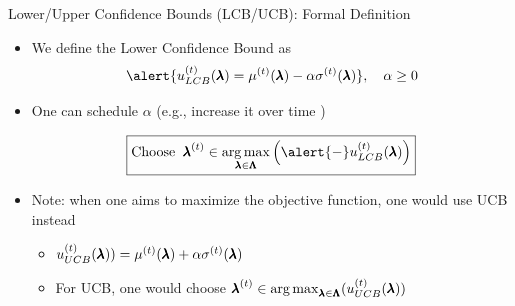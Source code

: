 \begin{frame}[c]{Lower/Upper Confidence Bounds (LCB/UCB): Formal Definition}
\begin{itemize}
    \item We define the \alert{Lower Confidence Bound} as
    \[\alert{\iter{\acq}_{LCB}(\conf) = \iter{\mean}(\conf) - \alpha\iter{\stddev}(\conf)},\quad\alpha\geq0\]

\bigskip
    \item One can schedule $\alpha$ (e.g., increase it over time )

\[
    \boxed{\text{Choose}\;\;\bonextsample \in \argmax_{\conf\in\pcs}\left(\alert{-} \iter{\acq}_{LCB}(\conf)\right)}
\]

\end{itemize}
    \bigskip
    \pause
    
    \begin{itemize}
    
    
        \item Note: when one aims to \alert{maximize} the objective function, one would use \alert{UCB} instead
        \begin{itemize}
            \item ${u}^{(t)}_{UCB}(\pmb{\lambda})) = {\mu}^{(t)}(\pmb{\lambda}) + \alpha{\sigma}^{(t)}(\pmb{\lambda})$ 
            \item For UCB, one would choose ${\pmb{\lambda}}^{(t)} \in \operatorname*{arg\,max}_{\pmb{\lambda}\in\pmb{\Lambda}}( {u}^{(t)}_{UCB}(\pmb{\lambda}))$ 
        \end{itemize}
    \end{itemize}
   
\end{frame}
